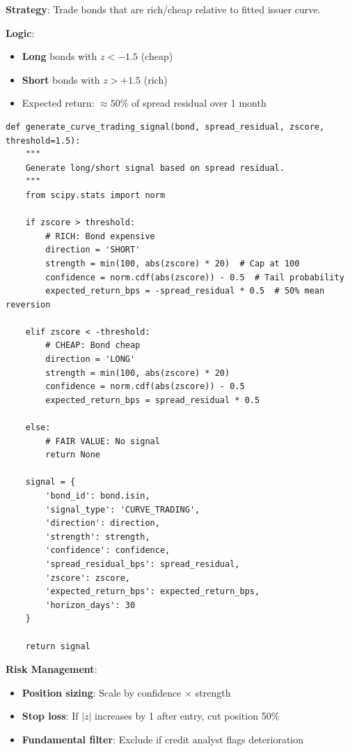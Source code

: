 \documentclass[11pt,a4paper]{article}
\begin{document}
\begin{keybox}
\textbf{Strategy}: Trade bonds that are rich/cheap relative to fitted issuer curve.

\textbf{Logic}:
\begin{itemize}
    \item \textbf{Long} bonds with $z < -1.5$ (cheap)
    \item \textbf{Short} bonds with $z > +1.5$ (rich)
    \item Expected return: $\approx 50\%$ of spread residual over 1 month
\end{itemize}
\end{keybox}

\begin{implbox}
\begin{lstlisting}
def generate_curve_trading_signal(bond, spread_residual, zscore, threshold=1.5):
    """
    Generate long/short signal based on spread residual.
    """
    from scipy.stats import norm
    
    if zscore > threshold:
        # RICH: Bond expensive
        direction = 'SHORT'
        strength = min(100, abs(zscore) * 20)  # Cap at 100
        confidence = norm.cdf(abs(zscore)) - 0.5  # Tail probability
        expected_return_bps = -spread_residual * 0.5  # 50% mean reversion
        
    elif zscore < -threshold:
        # CHEAP: Bond cheap
        direction = 'LONG'
        strength = min(100, abs(zscore) * 20)
        confidence = norm.cdf(abs(zscore)) - 0.5
        expected_return_bps = spread_residual * 0.5
        
    else:
        # FAIR VALUE: No signal
        return None
    
    signal = {
        'bond_id': bond.isin,
        'signal_type': 'CURVE_TRADING',
        'direction': direction,
        'strength': strength,
        'confidence': confidence,
        'spread_residual_bps': spread_residual,
        'zscore': zscore,
        'expected_return_bps': expected_return_bps,
        'horizon_days': 30
    }
    
    return signal
\end{lstlisting}

\textbf{Risk Management}:
\begin{itemize}
    \item \textbf{Position sizing}: Scale by confidence $\times$ strength
    \item \textbf{Stop loss}: If $|z|$ increases by 1 after entry, cut position 50\%
    \item \textbf{Fundamental filter}: Exclude if credit analyst flags deterioration
\end{itemize}
\end{implbox}
\end{document}
